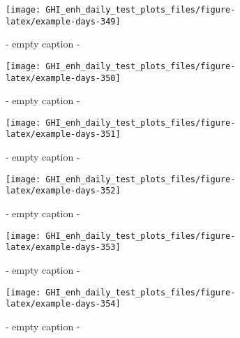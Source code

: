 \documentclass[
  10pt,
  a4paper,oneside]{article}
\begin{document}
\begin{figure}[H]

{\centering \texttt{[image: GHI\_enh\_daily\_test\_plots\_files/figure-latex/example-days-349]} 

}

\caption{ - empty caption - }\label{fig:example-days-349}
\end{figure}

\begin{figure}[H]

{\centering \texttt{[image: GHI\_enh\_daily\_test\_plots\_files/figure-latex/example-days-350]} 

}

\caption{ - empty caption - }\label{fig:example-days-350}
\end{figure}

\begin{figure}[H]

{\centering \texttt{[image: GHI\_enh\_daily\_test\_plots\_files/figure-latex/example-days-351]} 

}

\caption{ - empty caption - }\label{fig:example-days-351}
\end{figure}

\begin{figure}[H]

{\centering \texttt{[image: GHI\_enh\_daily\_test\_plots\_files/figure-latex/example-days-352]} 

}

\caption{ - empty caption - }\label{fig:example-days-352}
\end{figure}

\begin{figure}[H]

{\centering \texttt{[image: GHI\_enh\_daily\_test\_plots\_files/figure-latex/example-days-353]} 

}

\caption{ - empty caption - }\label{fig:example-days-353}
\end{figure}

\begin{figure}[H]

{\centering \texttt{[image: GHI\_enh\_daily\_test\_plots\_files/figure-latex/example-days-354]} 

}

\caption{ - empty caption - }\label{fig:example-days-354}
\end{figure}
\end{document}
